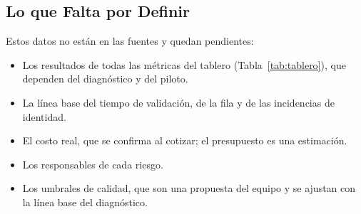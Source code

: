 \subsection{Lo que Falta por Definir}
Estos datos no están en las fuentes y quedan pendientes:
\begin{itemize}
	\item Los resultados de todas las métricas del tablero (Tabla~\ref{tab:tablero}),
	      que dependen del diagnóstico y del piloto.
	\item La línea base del tiempo de validación, de la fila y de las incidencias
	      de identidad.
	\item El costo real, que se confirma al cotizar; el presupuesto es una
	      estimación.
	\item Los responsables de cada riesgo.
	\item Los umbrales de calidad, que son una propuesta del equipo y se ajustan
	      con la línea base del diagnóstico.
\end{itemize}
